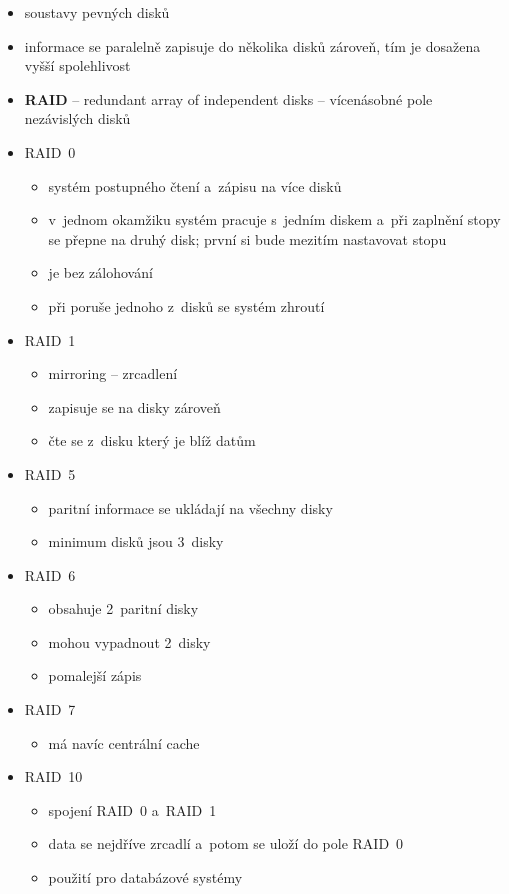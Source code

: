\documentclass[a4paper,12pt]{article}
\providecommand{\tightlist}{%
\setlength{\itemsep}{0pt}\setlength{\parskip}{0pt}}
\begin{document}
\begin{itemize}
\tightlist
\item soustavy pevných disků
\item informace se paralelně zapisuje do několika disků zároveň, tím je
  dosažena vyšší spolehlivost
\item \textbf{RAID} -- redundant array of independent disks -- vícenásobné
  pole nezávislých disků
\item RAID~0

  \begin{itemize}
  \tightlist
  \item systém postupného čtení a~zápisu na více disků
  \item v~jednom okamžiku systém pracuje s~jedním diskem a~při zaplnění
    stopy se přepne na druhý disk; první si bude mezitím nastavovat
    stopu
  \item je bez zálohování
  \item při poruše jednoho z~disků se systém zhroutí
  \end{itemize}
\item RAID~1

  \begin{itemize}
  \tightlist
  \item mirroring -- zrcadlení
  \item zapisuje se na disky zároveň
  \item čte se z~disku který je blíž datům
  \end{itemize}
\item RAID~5

  \begin{itemize}
  \tightlist
  \item paritní informace se ukládají na všechny disky
  \item minimum disků jsou 3~disky
  \end{itemize}
\item RAID~6

  \begin{itemize}
  \tightlist
  \item obsahuje 2~paritní disky
  \item mohou vypadnout 2~disky
  \item pomalejší zápis
  \end{itemize}
\item RAID~7

  \begin{itemize}
  \tightlist
  \item má navíc centrální cache
  \end{itemize}
\item RAID~10

  \begin{itemize}
  \tightlist
  \item spojení RAID~0 a~RAID~1
  \item data se nejdříve zrcadlí a~potom se uloží do pole RAID~0
  \item použití pro databázové systémy
  \end{itemize}
\end{itemize}
\end{document}
